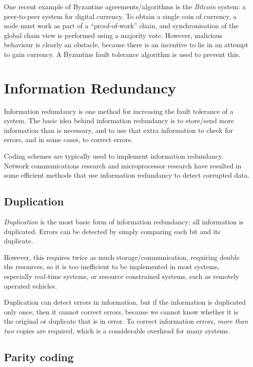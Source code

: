 One recent example of Byzantine agreements/algorithms is the \emph{Bitcoin} system: a peer-to-peer system for digital currency. To obtain a single coin of currency, a node must work as part of a ``proof-of-work'' chain, and synchronisation of the global chain view is performed using a majority vote. However, malicious behaviour is clearly an obstacle, because there is an incentive to lie in an attempt to gain currency. A Byzantine fault tolerance algorithm is used to prevent this.

\section{Information Redundancy}
\label{sec:fault-tolerance:information-redundancy}

Information redundancy is one method for increasing the fault tolerance of a system. The basic idea behind information redundancy is to store/send more information than is necessary, and to use that extra information to check for errors, and in some cases, to correct errors.

Coding schemes are typically used to implement information redundancy. Network communications research and microprocessor research have resulted in some efficient methods that use information redundancy to detect corrupted data.

\subsection{Duplication}

{\em Duplication} is the most basic form of information redundancy: all information is duplicated. Errors can be detected by simply comparing each bit and its duplicate.

However, this requires twice as much storage/communication, requiring double the resources, so it is too inefficient to be implemented in most systems, especially real-time systems, or resource constrained systems, such as remotely operated vehicles.

Duplication can detect errors in information, but if the information is duplicated only once, then it cannot correct errors, because we cannot know whether it is the original or duplicate that is in error. To correct information errors, \emph{more than two} copies are required, which is a considerable overhead for many systems.

\subsection{Parity coding}

